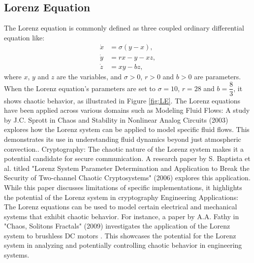 \documentclass[11pt]{article}
\theoremstyle{definition}
\begin{document}
\subsection{Lorenz Equation}
The Lorenz equation is commonly defined as three coupled ordinary differential equation like:
\begin{align*}
\dot{x} &= \sigma(y - x), \\
\dot{y} &= rx - y - xz, \\
\dot{z} &= xy - bz,
\end{align*}
where $x$, $y$ and $z$ are the variables, and $\sigma > 0$, $r > 0$ and $b > 0$ are parameters. \\
When the Lorenz equation's parameters are set to $\sigma = 10$, $r = 28$ and $b = \dfrac{8}{3}$, it shows chaotic behavior, as illustrated in Figure \ref{fig:LE}. The Lorenz equations \cite{lorenz_deterministic_1963} have been applied across various domains such as Modeling Fluid Flows:  A study by J.C. Sprott in Chaos and Stability in Nonlinear Analog Circuits (2003) \cite{tlelo-cuautle_analogdigital_2019} explores how the Lorenz system can be applied to model specific fluid flows. This demonstrates its use in understanding fluid dynamics beyond just atmospheric convection.\cite{petrzela_chaos_2022}.
Cryptography: The chaotic nature of the Lorenz system makes it a potential candidate for secure communication. A research paper by S. Baptista et al. titled "Lorenz System Parameter Determination and Application to Break the Security of Two-channel Chaotic Cryptosystems" (2006) explores this application. While this paper discusses limitations of specific implementations, it highlights the potential of the Lorenz system in cryptography \cite{orue_lorenz_2006}
Engineering Applications: The Lorenz equations can be used to model certain electrical and mechanical systems that exhibit chaotic behavior. For instance, a paper by A.A. Fathy in "Chaos, Solitons  Fractals" (2009) investigates the application of the Lorenz system to brushless DC motors \cite{ge_anti-control_2006}. This showcases the potential for the Lorenz system in analyzing and potentially controlling chaotic behavior in engineering systems.
\end{document}
